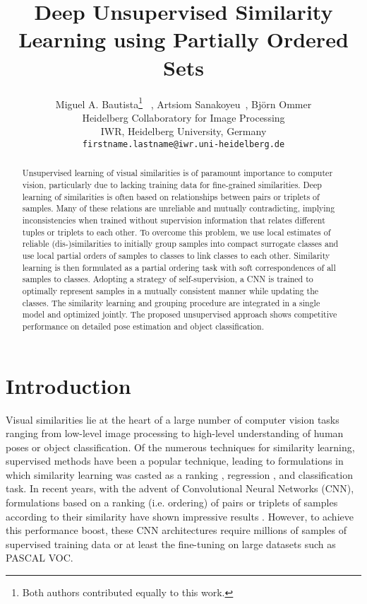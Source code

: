 \documentclass[10pt,twocolumn,letterpaper]{article}
\begin{document}
\title{Deep Unsupervised Similarity Learning using Partially Ordered Sets}

\author{Miguel A. Bautista\thanks{Both authors contributed equally to this work.} \ , Artsiom Sanakoyeu\footnotemark[1] \ , Bj{\"o}rn Ommer\\
Heidelberg Collaboratory for Image Processing\\
IWR, Heidelberg University, Germany\\ \texttt{firstname.lastname@iwr.uni-heidelberg.de}}
\maketitle

\begin{abstract}

Unsupervised learning of visual similarities is of paramount importance to computer vision, particularly due to lacking training data for fine-grained similarities. Deep learning of similarities is often based on relationships between pairs or triplets of samples. Many of these relations are unreliable and mutually contradicting, implying inconsistencies when trained without supervision information that relates different tuples or triplets to each other. To overcome this problem, we use local estimates of reliable (dis-)similarities to initially group samples into compact surrogate classes and use local partial orders of samples to classes to link classes to each other. Similarity learning is then formulated as a partial ordering task with soft correspondences of all samples to classes. Adopting a strategy of self-supervision, a CNN is trained to optimally represent samples in a mutually consistent manner while updating the classes.  The similarity learning and grouping procedure are integrated in a single model and optimized jointly. The proposed unsupervised approach shows competitive performance on detailed pose estimation and object classification. 

\end{abstract}

\section{Introduction}




Visual similarities lie at the heart of a large number of computer vision tasks ranging from low-level image processing to high-level understanding of human poses or object classification. Of the numerous techniques for similarity learning, supervised methods have been a popular technique, leading to formulations in which similarity learning was casted as a ranking \cite{simlearning1}, regression \cite{simregression}, and classification \cite{videoparsing} task. In recent years, with the advent of Convolutional Neural Networks (CNN), formulations based on a ranking (i.e. ordering) of pairs or triplets of samples according to their similarity have shown impressive results \cite{ConvNetpretext2}. However, to achieve this  performance boost, these CNN architectures require millions of samples of supervised training data or at least the fine-tuning \cite{ConvNetpretext1} on large datasets such as PASCAL VOC. 
\end{document}
